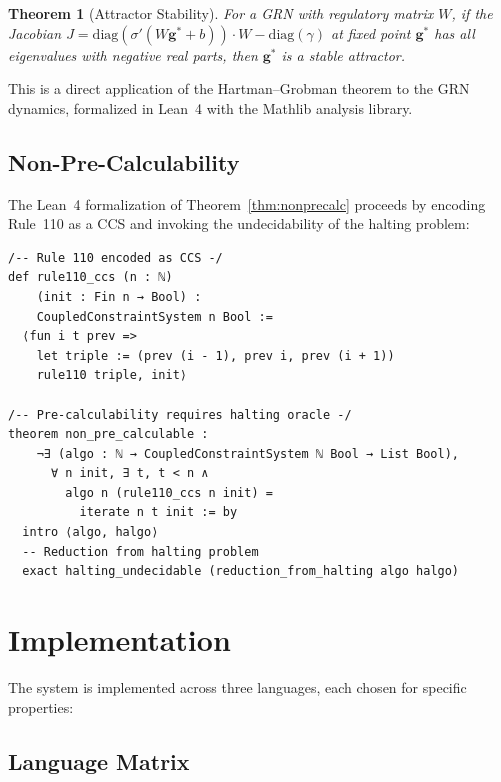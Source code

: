 \documentclass[11pt,a4paper]{article}
\newtheorem{theorem}{Theorem}[section]
\begin{document}
\begin{theorem}[Attractor Stability]\label{thm:attractor}
For a GRN with regulatory matrix $W$, if the Jacobian $J = \text{diag}(\sigma'(W\mathbf{g}^* + b)) \cdot W - \text{diag}(\gamma)$ at fixed point $\mathbf{g}^*$ has all eigenvalues with negative real parts, then $\mathbf{g}^*$ is a stable attractor.
\end{theorem}

This is a direct application of the Hartman--Grobman theorem to the GRN dynamics, formalized in Lean~4 with the Mathlib analysis library.

\subsection{Non-Pre-Calculability}

The Lean~4 formalization of Theorem~\ref{thm:nonprecalc} proceeds by encoding Rule~110 as a CCS and invoking the undecidability of the halting problem:

\begin{lstlisting}[language=Lean, caption={Non-pre-calculability formalization}]
/-- Rule 110 encoded as CCS -/
def rule110_ccs (n : ℕ)
    (init : Fin n → Bool) :
    CoupledConstraintSystem n Bool :=
  ⟨fun i t prev =>
    let triple := (prev (i - 1), prev i, prev (i + 1))
    rule110 triple, init⟩

/-- Pre-calculability requires halting oracle -/
theorem non_pre_calculable :
    ¬∃ (algo : ℕ → CoupledConstraintSystem ℕ Bool → List Bool),
      ∀ n init, ∃ t, t < n ∧
        algo n (rule110_ccs n init) =
          iterate n t init := by
  intro ⟨algo, halgo⟩
  -- Reduction from halting problem
  exact halting_undecidable (reduction_from_halting algo halgo)
\end{lstlisting}

\section{Implementation}\label{sec:impl}

The system is implemented across three languages, each chosen for specific properties:

\subsection{Language Matrix}
\end{document}
